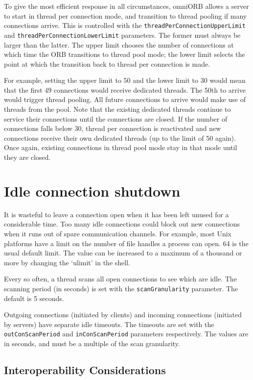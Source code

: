 \documentclass[11pt,twoside,a4paper]{book}
\newcommand{\code}[1]{\texttt{#1}}
\newcommand{\dsc}{\discretionary{}{}{}}
\begin{document}
To give the most efficient response in all circumstances, omniORB
allows a server to start in thread per connection mode, and transition
to thread pooling if many connections arrive. This is controlled with
the \code{threadPerConnection\dsc{}UpperLimit} and
\code{threadPerConnectionLowerLimit} parameters. The former must
always be larger than the latter. The upper limit chooses the number
of connections at which time the ORB transitions to thread pool mode;
the lower limit selects the point at which the transition back to
thread per connection is made.

For example, setting the upper limit to 50 and the lower limit to 30
would mean that the first 49 connections would receive dedicated
threads. The 50th to arrive would trigger thread pooling. All future
connections to arrive would make use of threads from the pool. Note
that the existing dedicated threads continue to service their
connections until the connections are closed. If the number of
connections falls below 30, thread per connection is reactivated and
new connections receive their own dedicated threads (up to the limit
of 50 again). Once again, existing connections in thread pool mode
stay in that mode until they are closed.


\section{Idle connection shutdown}
\label{sec:connShutdown}

It is wasteful to leave a connection open when it has been left unused
for a considerable time. Too many idle connections could block out new
connections when it runs out of spare communication channels. For
example, most Unix platforms have a limit on the number of file
handles a process can open. 64 is the usual default limit. The value
can be increased to a maximum of a thousand or more by changing the
`ulimit' in the shell.

Every so often, a thread scans all open connections to see which are
idle. The scanning period (in seconds) is set with the
\code{scanGranularity} parameter. The default is 5 seconds.

Outgoing connections (initiated by clients) and incoming connections
(initiated by servers) have separate idle timeouts.  The timeouts are
set with the \code{outConScan\dsc{}Period} and \code{inConScanPeriod}
parameters respectively. The values are in seconds, and must be a
multiple of the scan granularity.


\subsection{Interoperability Considerations}
\end{document}
